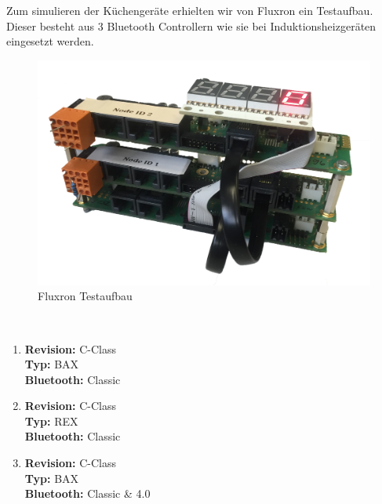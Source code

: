 Zum simulieren der Küchengeräte erhielten wir von Fluxron ein Testaufbau. Dieser besteht aus 3 Bluetooth Controllern wie sie bei Induktionsheizgeräten eingesetzt werden.

\begin{figure}
	\includegraphics[scale=0.1025]{appendix/res/fluxron_device_transparent}
	\caption{Fluxron Testaufbau}
\end{figure}

\ 

\begin{enumerate}
\item \textbf{Revision:} C-Class\\ \textbf{Typ:} BAX\\ \textbf{Bluetooth:} Classic\\
\item \textbf{Revision:} C-Class\\ \textbf{Typ:} REX\\ \textbf{Bluetooth:} Classic\\
\item \textbf{Revision:} C-Class\\ \textbf{Typ:} BAX\\ \textbf{Bluetooth:} Classic \& 4.0
\end{enumerate}
